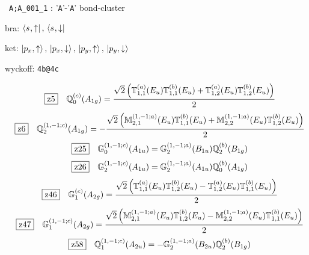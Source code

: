 \documentclass[fleqn,10pt,landscape]{jsarticle}
\begin{document}
\noindent\textbullet\, \texttt{A;A_001_1} : '\texttt{A}'-'\texttt{A}' bond-cluster

\noindent\quad * bra: $\bra{s_{},\uparrow},\, \bra{s_{},\downarrow}$

\noindent\quad * ket: $\ket{p_{x},\uparrow},\, \ket{p_{x},\downarrow},\, \ket{p_{y},\uparrow},\, \ket{p_{y},\downarrow}$

\noindent\quad * wyckoff: \texttt{4b@4c}

\begin{dmath*}
\hspace*{3mm}\fbox{z5}\quad \mathbb{Q}_{0}^{(c)}(A_{1g})=\frac{\sqrt{2} \left(\mathbb{T}_{1,1}^{(a)}(E_{u}) \mathbb{T}_{1,1}^{(b)}(E_{u}) + \mathbb{T}_{1,2}^{(a)}(E_{u}) \mathbb{T}_{1,2}^{(b)}(E_{u})\right)}{2}
\end{dmath*}
\begin{dmath*}
\hspace*{3mm}\fbox{z6}\quad \mathbb{Q}_{2}^{(1,-1;c)}(A_{1g})=- \frac{\sqrt{2} \left(\mathbb{M}_{2,1}^{(1,-1;a)}(E_{u}) \mathbb{T}_{1,1}^{(b)}(E_{u}) + \mathbb{M}_{2,2}^{(1,-1;a)}(E_{u}) \mathbb{T}_{1,2}^{(b)}(E_{u})\right)}{2}
\end{dmath*}
\begin{dmath*}
\hspace*{3mm}\fbox{z25}\quad \mathbb{G}_{0}^{(1,-1;c)}(A_{1u})=\mathbb{G}_{2}^{(1,-1;a)}(B_{1u}) \mathbb{Q}_{2}^{(b)}(B_{1g})
\end{dmath*}
\begin{dmath*}
\hspace*{3mm}\fbox{z26}\quad \mathbb{G}_{2}^{(1,-1;c)}(A_{1u})=\mathbb{G}_{2}^{(1,-1;a)}(A_{1u}) \mathbb{Q}_{0}^{(b)}(A_{1g})
\end{dmath*}
\begin{dmath*}
\hspace*{3mm}\fbox{z46}\quad \mathbb{G}_{1}^{(c)}(A_{2g})=\frac{\sqrt{2} \left(\mathbb{T}_{1,1}^{(a)}(E_{u}) \mathbb{T}_{1,2}^{(b)}(E_{u}) - \mathbb{T}_{1,2}^{(a)}(E_{u}) \mathbb{T}_{1,1}^{(b)}(E_{u})\right)}{2}
\end{dmath*}
\begin{dmath*}
\hspace*{3mm}\fbox{z47}\quad \mathbb{G}_{1}^{(1,-1;c)}(A_{2g})=\frac{\sqrt{2} \left(\mathbb{M}_{2,1}^{(1,-1;a)}(E_{u}) \mathbb{T}_{1,2}^{(b)}(E_{u}) - \mathbb{M}_{2,2}^{(1,-1;a)}(E_{u}) \mathbb{T}_{1,1}^{(b)}(E_{u})\right)}{2}
\end{dmath*}
\begin{dmath*}
\hspace*{3mm}\fbox{z58}\quad \mathbb{Q}_{1}^{(1,-1;c)}(A_{2u})=- \mathbb{G}_{2}^{(1,-1;a)}(B_{2u}) \mathbb{Q}_{2}^{(b)}(B_{1g})
\end{dmath*}
\end{document}
